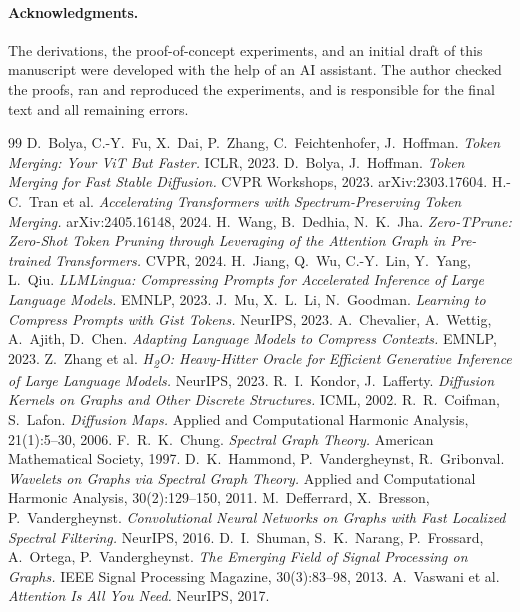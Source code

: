 \documentclass[11pt]{article}
\begin{document}
\paragraph{Acknowledgments.}
The derivations, the proof-of-concept experiments, and an initial draft of this manuscript were
developed with the help of an AI assistant. The author checked the proofs, ran and reproduced the
experiments, and is responsible for the final text and all remaining errors.

\begin{thebibliography}{99}
\small
{} D.~Bolya, C.-Y.~Fu, X.~Dai, P.~Zhang, C.~Feichtenhofer, J.~Hoffman.
\emph{Token Merging: Your ViT But Faster.} ICLR, 2023.
 D.~Bolya, J.~Hoffman. \emph{Token Merging for Fast Stable Diffusion.}
CVPR Workshops, 2023. arXiv:2303.17604.
 H.-C.~Tran et al. \emph{Accelerating Transformers with
Spectrum-Preserving Token Merging.} arXiv:2405.16148, 2024.
 H.~Wang, B.~Dedhia, N.~K.~Jha. \emph{Zero-TPrune: Zero-Shot Token
Pruning through Leveraging of the Attention Graph in Pre-trained Transformers.} CVPR, 2024.
 H.~Jiang, Q.~Wu, C.-Y.~Lin, Y.~Yang, L.~Qiu. \emph{LLMLingua:
Compressing Prompts for Accelerated Inference of Large Language Models.} EMNLP, 2023.
 J.~Mu, X.~L.~Li, N.~Goodman. \emph{Learning to Compress Prompts with Gist
Tokens.} NeurIPS, 2023.
 A.~Chevalier, A.~Wettig, A.~Ajith, D.~Chen. \emph{Adapting
Language Models to Compress Contexts.} EMNLP, 2023.
 Z.~Zhang et al. \emph{H\textsubscript{2}O: Heavy-Hitter Oracle for Efficient
Generative Inference of Large Language Models.} NeurIPS, 2023.
 R.~I.~Kondor, J.~Lafferty. \emph{Diffusion Kernels on Graphs and
Other Discrete Structures.} ICML, 2002.
 R.~R.~Coifman, S.~Lafon. \emph{Diffusion Maps.} Applied and
Computational Harmonic Analysis, 21(1):5--30, 2006.
 F.~R.~K.~Chung. \emph{Spectral Graph Theory.} American Mathematical
Society, 1997.
 D.~K.~Hammond, P.~Vandergheynst, R.~Gribonval. \emph{Wavelets on
Graphs via Spectral Graph Theory.} Applied and Computational Harmonic Analysis,
30(2):129--150, 2011.
 M.~Defferrard, X.~Bresson, P.~Vandergheynst. \emph{Convolutional
Neural Networks on Graphs with Fast Localized Spectral Filtering.} NeurIPS, 2016.
 D.~I.~Shuman, S.~K.~Narang, P.~Frossard, A.~Ortega, P.~Vandergheynst.
\emph{The Emerging Field of Signal Processing on Graphs.} IEEE Signal Processing Magazine,
30(3):83--98, 2013.
 A.~Vaswani et al. \emph{Attention Is All You Need.} NeurIPS, 2017.
\end{thebibliography}
\end{document}
